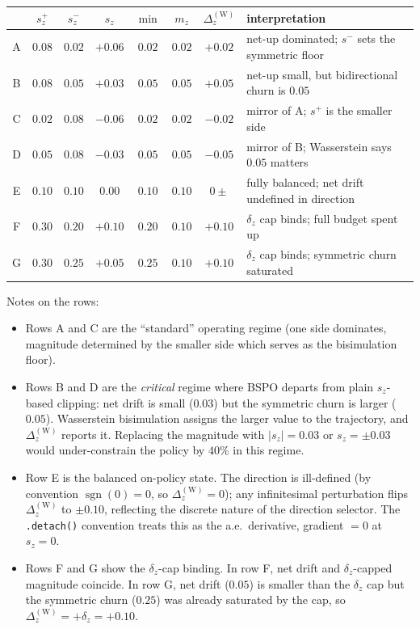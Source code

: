 \documentclass{article}
\begin{document}
\begin{center}
\renewcommand{\arraystretch}{1.35}
\begin{tabular}{c | c c c c c | c | l}
 & $s_z^+$ & $s_z^-$ & $s_z$ & $\min$ & $m_z$ & $\Delta_z^{(\text{W})}$ & interpretation \\ \hline
A & $0.08$ & $0.02$ & $+0.06$ & $0.02$ & $0.02$ & $+0.02$ & net-up dominated; $s^-$ sets the symmetric floor \\
B & $0.08$ & $0.05$ & $+0.03$ & $0.05$ & $0.05$ & $+0.05$ & net-up small, but bidirectional churn is $0.05$ \\
C & $0.02$ & $0.08$ & $-0.06$ & $0.02$ & $0.02$ & $-0.02$ & mirror of A; $s^+$ is the smaller side \\
D & $0.05$ & $0.08$ & $-0.03$ & $0.05$ & $0.05$ & $-0.05$ & mirror of B; Wasserstein says $0.05$ matters \\
E & $0.10$ & $0.10$ & $0.00$  & $0.10$ & $0.10$ & $0\pm$ & fully balanced; net drift undefined in direction \\
F & $0.30$ & $0.20$ & $+0.10$ & $0.20$ & $0.10$ & $+0.10$ & $\delta_z$ cap binds; full budget spent up \\
G & $0.30$ & $0.25$ & $+0.05$ & $0.25$ & $0.10$ & $+0.10$ & $\delta_z$ cap binds; symmetric churn saturated \\
\end{tabular}
\end{center}

Notes on the rows:
\begin{itemize}
\item Rows A and C are the ``standard'' operating regime (one side
dominates, magnitude determined by the smaller side which serves as the
bisimulation floor).
\item Rows B and D are the \emph{critical} regime where BSPO departs
from plain $s_z$-based clipping: net drift is small ($0.03$) but the
symmetric churn is larger ($0.05$). Wasserstein bisimulation assigns
the larger value to the trajectory, and $\Delta_z^{(\text{W})}$ reports
it. Replacing the magnitude with $|s_z|=0.03$ or $s_z=\pm 0.03$ would
under-constrain the policy by $40\%$ in this regime.
\item Row E is the balanced on-policy state. The direction is
ill-defined (by convention $\operatorname{sgn}(0)=0$, so
$\Delta_z^{(\text{W})} = 0$); any infinitesimal perturbation flips
$\Delta_z^{(\text{W})}$ to $\pm 0.10$, reflecting the discrete nature
of the direction selector. The \verb|.detach()| convention treats this
as the a.e.\ derivative, gradient $=0$ at $s_z=0$.
\item Rows F and G show the $\delta_z$-cap binding. In row F, net drift
and $\delta_z$-capped magnitude coincide. In row G, net drift ($0.05$)
is smaller than the $\delta_z$ cap but the symmetric churn ($0.25$) was
already saturated by the cap, so $\Delta_z^{(\text{W})} = +\delta_z = +0.10$.
\end{itemize}
\end{document}
